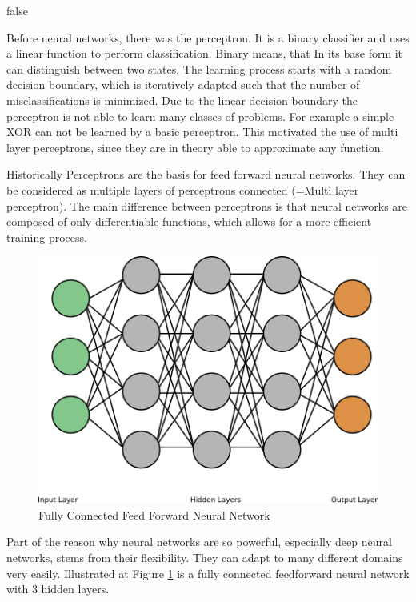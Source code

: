 \documentclass[draft,final,oneside]{vutinfth} %
\begin{document}
\if false

Before neural networks, there was the perceptron. It is a binary classifier and uses a linear function to perform classification. Binary means, that In its base form it can distinguish between two states. The learning process starts with a random decision boundary, which is iteratively adapted such that the number of misclassifications is minimized. Due to the linear decision boundary the perceptron is not able to learn many classes of problems. For example a simple XOR can not be learned by a basic perceptron. This motivated the use of multi layer perceptrons, since they are in theory able to approximate any function.

Historically Perceptrons are the basis for feed forward neural networks. They can be considered as multiple layers of perceptrons connected (=Multi layer perceptron). The main difference between perceptrons is that neural networks are composed of only differentiable functions, which allows for a more efficient training process.

\begin{figure}[ht]
	\centering
  	\includegraphics[width=1\textwidth]{graphics/simple_neural_network.png}
	\caption{Fully Connected Feed Forward Neural Network}
	\label{fig:feedforward}
\end{figure}

Part of the reason why neural networks are so powerful, especially deep neural networks, stems from their flexibility. They can adapt to many different domains very easily. Illustrated at Figure \ref{fig:feedforward} is a fully connected feedforward neural network with 3 hidden layers. 
\end{document}
